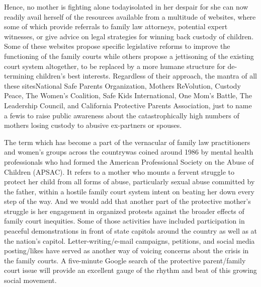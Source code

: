 Hence, no mother is fighting alone today\mdash{}isolated in her despair\mdash{}
for she can now readily avail herself of the resources available from a
multitude of websites, where some of which provide referrals to family 
law attorneys, potential expert witnesses, or give advice on legal
strategies for winning back custody of children. Some of these websites
propose specific legislative reforms to improve the functioning of the
family courts while others propose a jettisoning of the existing court
system altogether, to be replaced by a more humane structure for de-
termining children's best interests. Regardless of their approach, the
mantra of all these sites\mdash{}National Safe Parents Organization, Mothers ReVolution, Custody Peace, The Women's Coalition, 
Safe Kids International, One Mom's Battle, 
The Leadership Council, and California 
Protective Parents Association, just to name a few\mdash{}is to raise
public awareness about the catastrophically high numbers of mothers
losing custody to abusive ex-partners or spouses. \pfl{}


The term \mdash{}which has become a part of the vernacular of family law practitioners and women's groups across the
country\mdash{}was coined around 1986 by mental health professionals who
had formed the American Professional Society on the Abuse of Children
(APSAC). It refers to a mother who mounts a fervent struggle to protect
her child from all forms of abuse, particularly sexual abuse committed by 
the father, within a hostile family court system intent on beating her
down every step of the way. And we would add that another
part of the protective mother's struggle is her engagement in organized
protests against the broader effects of family court inequities. Some of
those activities have included participation in peaceful demonstrations
in front of state capitols around the country as well as at the nation's
capitol. Letter-writing/e-mail campaigns, petitions, and social media
posting/likes have served as another way of voicing concerns about the
crisis in the family courts. A five-minute Google search of the protective
parent/family court issue will provide an excellent gauge of the rhythm
and beat of this growing social movement. \pfl{}

\vspace{4em}

